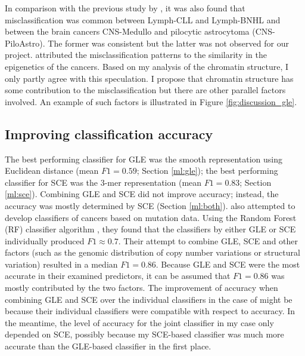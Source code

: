 In comparison with the previous study by \citet{Jiao2020}, it was also found that misclassification was common between Lymph-CLL and Lymph-BNHL and between the brain cancers CNS-Medullo and pilocytic astrocytoma (CNS-PiloAstro). The former was consistent but the latter was not observed for our project. \citet{Jiao2020} attributed the misclassification patterns to the similarity in the epigenetics of the cancers. Based on my analysis of the chromatin structure, I only partly agree with this speculation. I propose that chromatin structure has some contribution to the misclassification but there are other parallel factors involved. An example of such factors is illustrated in Figure \ref{fig:discussion_gle}.

\subsection{Improving classification accuracy}
The best performing classifier for GLE was the smooth representation using Euclidean distance (mean $F1=0.59$; Section \ref{ml:gle}); the best performing classifier for SCE was the 3-mer representation (mean $F1=0.83$; Section \ref{ml:sce}). Combining GLE and SCE did not improve accuracy; instead, the accuracy was mostly determined by SCE (Section \ref{ml:both}). \citet{Jiao2020} also attempted to develop classifiers of cancers based on mutation data. Using the Random Forest (RF) classifier algorithm \citep{Lindner2017AutomatedModels}, they found that the classifiers by either GLE or SCE individually produced $F1\approx0.7$. Their attempt to combine GLE, SCE and other factors (such as the genomic distribution of copy number variations or structural variation) resulted in a median $F1=0.86$. Because GLE and SCE were the most accurate in their examined predictors, it can be assumed that $F1=0.86$ was mostly contributed by the two factors. The improvement of accuracy when combining GLE and SCE over the individual classifiers in the case of \citet{Jiao2020} might be because their individual classifiers were compatible with respect to accuracy. In the meantime, the level of accuracy for the joint classifier in my case only depended on SCE, possibly because my SCE-based classifier was much more accurate than the GLE-based classifier in the first place. 

